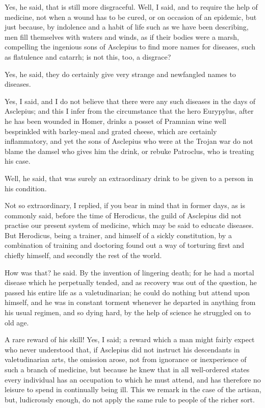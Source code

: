 Yes, he said, that is still more disgraceful.
Well, I said, and to require the help of medicine, not when a wound has to be cured, or on occasion of an epidemic, but just because, by indolence and a habit of life such as we have been describing, men fill themselves with waters and winds, as if their bodies were a marsh, compelling the ingenious sons of Asclepius to find more names for diseases, such as flatulence and catarrh; is not this, too, a disgrace?

Yes, he said, they do certainly give very strange and newfangled names to diseases.

Yes, I said, and I do not believe that there were any such diseases in the days of Asclepius; and this I infer from the circumstance that the hero Eurypylus, after he has been wounded in Homer, drinks a posset of Pramnian wine well besprinkled with barley-meal and grated cheese, which are certainly inflammatory, and yet the sons of Asclepius who were at the Trojan war do not blame the damsel who gives him the drink, or rebuke Patroclus, who is treating his case.

Well, he said, that was surely an extraordinary drink to be given to a person in his condition.

Not so extraordinary, I replied, if you bear in mind that in former days, as is commonly said, before the time of Herodicus, the guild of Asclepius did not practise our present system of medicine, which may be said to educate diseases. But Herodicus, being a trainer, and himself of a sickly constitution, by a combination of training and doctoring found out a way of torturing first and chiefly himself, and secondly the rest of the world.

How was that? he said.
By the invention of lingering death; for he had a mortal disease which he perpetually tended, and as recovery was out of the question, he passed his entire life as a valetudinarian; he could do nothing but attend upon himself, and he was in constant torment whenever he departed in anything from his usual regimen, and so dying hard, by the help of science he struggled on to old age.

A rare reward of his skill!
Yes, I said; a reward which a man might fairly expect who never understood that, if Asclepius did not instruct his descendants in valetudinarian arts, the omission arose, not from ignorance or inexperience of such a branch of medicine, but because he knew that in all well-ordered states every individual has an occupation to which he must attend, and has therefore no leisure to spend in continually being ill. This we remark in the case of the artisan, but, ludicrously enough, do not apply the same rule to people of the richer sort.

